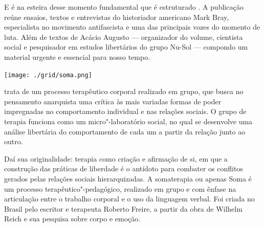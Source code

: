 E é na esteira desse momento fundamental que é estruturado {}. A publicação reúne ensaios, textos e entrevistas do historiador americano Mark Bray, especialista no movimento antifascista e uma das principais vozes do momento de luta. Além de textos de Acácio Augusto --- organizador do volume, cientista social e pesquisador em estudos libertários do grupo Nu-Sol --- compondo um material urgente e essencial para nosso tempo.

\vfill

\hspace*{-.4cm}\begin{minipage}[c]{.5\linewidth}
\small{
{}}
\end{minipage}

\pagebreak

\begin{center}
\hspace*{-2.5cm}
\hspace*{2.5cm}\texttt{[image: ./grid/soma.png]}
\end{center}

\hspace*{-7cm}\hrulefill\hspace*{-7cm}

\medskip

 trata de um processo terapêutico corporal realizado em grupo, que busca no pensamento anarquista uma crítica às mais variadas formas de poder impregnadas no comportamento individual e nas relações sociais. O grupo de terapia funciona como um micro"-laboratório social, no qual se desenvolve uma análise libertária do comportamento de cada um a partir da relação junto ao outro.

Daí sua originalidade: terapia como criação e afirmação de si, em que a construção das práticas de liberdade é o antídoto para combater os conflitos gerados pelas relações sociais hierarquizadas. A somaterapia ou apenas Soma é um processo terapêutico"-pedagógico, realizado em grupo e com ênfase na articulação entre o trabalho corporal e o uso da linguagem verbal. Foi criada no Brasil pelo escritor e terapeuta Roberto Freire, a partir da obra de Wilhelm Reich e sua pesquisa sobre corpo e emoção.

